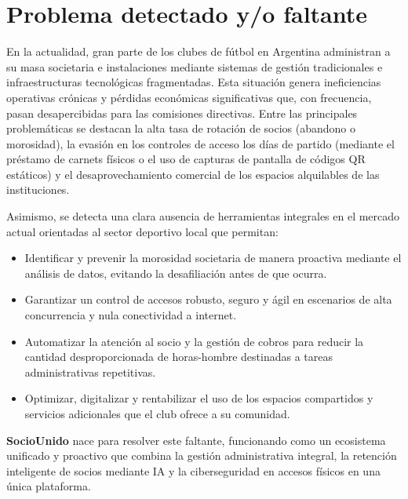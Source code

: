 \section{Problema detectado y/o faltante}

En la actualidad, gran parte de los clubes de fútbol en Argentina administran a su masa societaria e instalaciones mediante sistemas de gestión tradicionales e infraestructuras tecnológicas fragmentadas. Esta situación genera ineficiencias operativas crónicas y pérdidas económicas significativas que, con frecuencia, pasan desapercibidas para las comisiones directivas. Entre las principales problemáticas se destacan la alta tasa de rotación de socios (abandono o morosidad), la evasión en los controles de acceso los días de partido (mediante el préstamo de carnets físicos o el uso de capturas de pantalla de códigos QR estáticos) y el desaprovechamiento comercial de los espacios alquilables de las instituciones.

Asimismo, se detecta una clara ausencia de herramientas integrales en el mercado actual orientadas al sector deportivo local que permitan:

\begin{itemize}
    \item Identificar y prevenir la morosidad societaria de manera proactiva mediante el análisis de datos, evitando la desafiliación antes de que ocurra.
    \item Garantizar un control de accesos robusto, seguro y ágil en escenarios de alta concurrencia y nula conectividad a internet.
    \item Automatizar la atención al socio y la gestión de cobros para reducir la cantidad desproporcionada de horas-hombre destinadas a tareas administrativas repetitivas.
    \item Optimizar, digitalizar y rentabilizar el uso de los espacios compartidos y servicios adicionales que el club ofrece a su comunidad.
\end{itemize}

\textbf{SocioUnido} nace para resolver este faltante, funcionando como un ecosistema unificado y proactivo que combina la gestión administrativa integral, la retención inteligente de socios mediante IA y la ciberseguridad en accesos físicos en una única plataforma.
